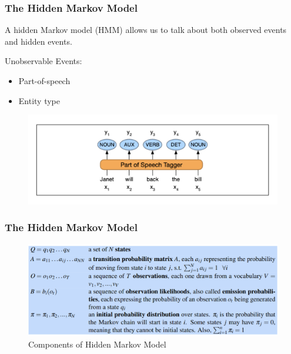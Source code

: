\documentclass[13.5pt,aspecratio=169]{beamer}
\begin{document}
\begin{frame}
\onehalfspacing
	\frametitle{The Hidden Markov Model}
        \begin{block}{}
            A hidden Markov model (HMM) allows us to talk about both observed events and hidden events.
        \end{block}

        {\large{Unobservable Events:}
        \begin{itemize}
            \item Part-of-speech
            \item Entity type
        \end{itemize}   
        }
        \begin{figure}
            \centering
            \includegraphics [scale=0.7] {POS_Tagger.png}
        \end{figure}
	
\end{frame}

\begin{frame}
    \onehalfspacing
        \frametitle{The Hidden Markov Model}
            \begin{figure}[h]
                \centering
                \includegraphics[scale=0.45]{HMM_components.png}
                \caption{ Components of Hidden Markov Model}
            \end{figure}
        
    \end{frame}
\end{document}

